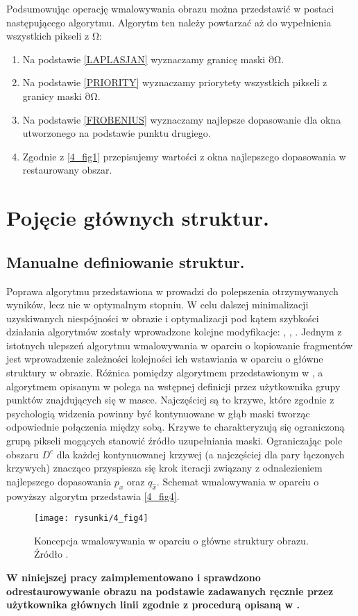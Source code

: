 \documentclass[a4paper,12pt,twoside,openany]{report}
\begin{document}
Podsumowując operację wmalowywania obrazu można przedstawić w postaci następującego algorytmu. Algorytm ten należy powtarzać aż do wypełnienia wszystkich pikseli z $\mathrm{\Omega }$:
\begin{enumerate}
\item
Na podstawie \eqref{LAPLASJAN} wyznaczamy granicę maski $\mathrm{\partial }\mathrm{\Omega }$.
\item
Na podstawie \eqref{PRIORITY} wyznaczamy priorytety wszystkich pikseli z granicy maski $\mathrm{\partial }\mathrm{\Omega }$.
\item
Na podstawie \eqref{FROBENIUS} wyznaczamy najlepsze dopasowanie dla okna utworzonego na podstawie punktu drugiego.
\item
Zgodnie z \autoref{4_fig1} przepisujemy wartości z okna najlepszego dopasowania w restaurowany obszar.
\end{enumerate}
\section{Pojęcie głównych struktur.}
\label{sec:crimMetodSalient}
\subsection{Manualne definiowanie struktur.}
Poprawa algorytmu przedstawiona w \cite{criminisi2004region} prowadzi do polepszenia otrzymywanych wyników, lecz nie w optymalnym stopniu. W celu dalszej minimalizacji uzyskiwanych niespójności w obrazie i optymalizacji pod kątem szybkości działania algorytmów zostały wprowadzone kolejne modyfikacje: \cite{StructurePropagationManual},  \cite{malluvalasaimplementation}, \cite{SalientStrucTexProp}. 
Jednym z istotnych ulepszeń algorytmu wmalowywania w oparciu o kopiowanie fragmentów jest wprowadzenie zależności kolejności ich wstawiania w oparciu o główne struktury w obrazie.
Różnica pomiędzy algorytmem przedstawionym w \cite{criminisi2004region}, a algorytmem opisanym w \cite{StructurePropagationManual} polega na wstępnej definicji przez użytkownika grupy punktów znajdujących się w masce. Najczęściej są to krzywe, które zgodnie z psychologią widzenia powinny być kontynuowane w głąb maski tworząc odpowiednie połączenia między sobą. Krzywe te charakteryzują się ograniczoną grupą pikseli mogących stanowić źródło uzupełniania maski. Ograniczając pole obszaru $D^c$ dla każdej kontynuowanej krzywej (a najczęściej dla pary łączonych krzywych) znacząco przyspiesza się krok iteracji związany z odnalezieniem najlepszego dopasowania $p_x$ oraz $q_{\hat{x}}$. Schemat wmalowywania w oparciu o powyższy algorytm przedstawia \autoref{4_fig4}.
\begin{figure}[!h]
	\centering
	\texttt{[image: rysunki/4\_fig4]}
	\caption{Koncepcja wmalowywania w oparciu o główne struktury obrazu. Źródło \cite{StructurePropagationManual}.}
	\label{4_fig4} 
\end{figure}
\textbf{W niniejszej pracy zaimplementowano i sprawdzono odrestaurowywanie obrazu na podstawie zadawanych ręcznie przez użytkownika głównych linii zgodnie z procedurą opisaną w  \cite{StructurePropagationManual}.}
\end{document}
